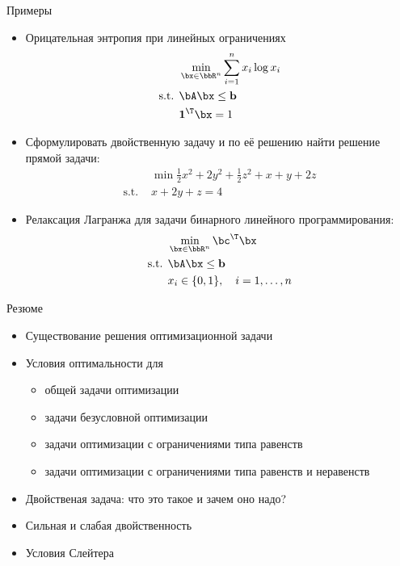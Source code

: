 \documentclass[12pt]{beamer}
\begin{document}
\begin{frame}{Примеры}
\footnotesize
\begin{itemize}
\item Орицательная энтропия при линейных ограничениях
\vspace{-5mm}
\begin{equation*}
\begin{split}
& \min\limits_{\bx \in \bbR^n} \sum\limits_{i=1}^n x_i \log x_i\\
\text{s.t. } & \bA\bx \leq \mathbf{b}\\
& \mathbf{1}^{\T}\bx = 1
\end{split}
\end{equation*} 
\item Сформулировать двойственную задачу и по её решению найти решение прямой задачи:
\begin{equation*}
\begin{split}
& \min \frac{1}{2}x^2 + 2y^2 + \frac{1}{2}z^2 + x + y + 2z\\
\text{s.t. } & x+2y+z = 4
\end{split}
\end{equation*}
\item Релаксация Лагранжа для задачи бинарного линейного программирования:
\begin{equation*}
\begin{split}
&\min\limits_{\bx \in \bbR^n} \bc^{\T}\bx\\
\text{s.t. } & \bA \bx \leq \mathbf{b}\\
& x_i \in \{0,1 \}, \quad i = 1,\ldots,n
\end{split}
\end{equation*}
\end{itemize}
\end{frame}

\begin{frame}{Резюме}
\begin{itemize}
\item Существование решения оптимизационной задачи 
\item Условия оптимальности для
\begin{itemize}
\item общей задачи оптимизации
\item задачи безусловной оптимизации
\item задачи оптимизации с ограничениями типа равенств
\item задачи оптимизации с ограничениями типа равенств и неравенств
\end{itemize}
\item Двойственая задача: что это такое и зачем оно надо?
\item Сильная и слабая двойственность
\item Условия Слейтера
\end{itemize}
\end{frame}
\end{document}

